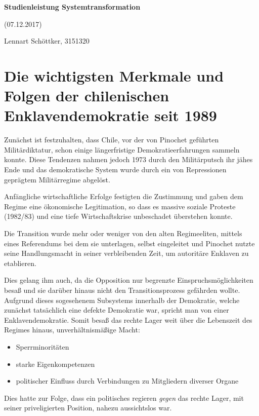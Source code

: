 \documentclass[12pt]{article}
\begin{document}
\thispagestyle{plain}
\begin{center}
    \LARGE
    \textbf{Studienleistung Systemtransformation}
    

    \small(07.12.2017)

    \vspace{0.2cm}
    \large
    Lennart Schöttker, 3151320

\end{center}
 \vspace{0.4cm}

\section{Die wichtigsten Merkmale und Folgen der chilenischen Enklavendemokratie seit 1989}
Zunächst ist festzuhalten, dass Chile, vor der von Pinochet geführten Militärdiktatur, schon einige längerfristige Demokratieerfahrungen sammeln konnte. Diese Tendenzen nahmen jedoch 1973 durch den Militärputsch ihr jähes Ende und das demokratische System wurde durch ein von Repressionen geprägtem Militärregime abgelöst.

Anfängliche wirtschaftliche Erfolge festigten die Zustimmung und gaben dem Regime eine ökonomische Legitimation, so dass es massive soziale Proteste (1982/83) und eine tiefe Wirtschaftskrise unbeschadet überstehen konnte.

Die Transition wurde mehr oder weniger von den alten Regimeeliten, mittels eines Referendums bei dem sie unterlagen, selbst eingeleitet und Pinochet nutzte seine Handlungsmacht in seiner verbleibenden Zeit, um autoritäre Enklaven zu etablieren.

Dies gelang ihm auch, da die Opposition nur begrenzte Einspruchsmöglichkeiten besaß und sie darüber hinaus nicht den Transitionsprozess gefährden wollte. Aufgrund dieses sogesehenem Subsystems innerhalb der Demokratie, welche zunächst tatsächlich eine defekte Demokratie war, spricht man von einer Enklavendemokratie.
Somit besaß das rechte Lager weit über die Lebenszeit des Regimes hinaus, unverhältnismäßige Macht:
\begin{itemize}
  \item  Sperrminoritäten
  \item  starke Eigenkompetenzen
  \item  politischer Einfluss durch Verbindungen zu Mitgliedern diverser Organe
\end{itemize}

Dies hatte zur Folge, dass ein politisches regieren \emph{gegen} das rechte Lager, mit seiner priveligierten Position, nahezu aussichtslos war.
\end{document}

